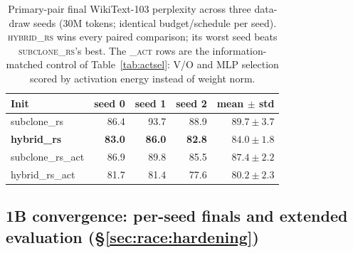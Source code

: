 \begin{table}[h]
\centering
\footnotesize
\caption{Primary-pair final WikiText-103 perplexity across three data-draw seeds
(30M tokens; identical budget/schedule per seed). \textsc{hybrid\_rs} wins every
paired comparison; its worst seed beats \textsc{subclone\_rs}'s best. The
\textsc{\_act} rows are the information-matched control of
Table~\ref{tab:actsel}: V/O and MLP selection scored by activation energy
instead of weight norm.}
\label{tab:seeded}
\begin{tabular}{lrrrr}
\toprule
Init & seed 0 & seed 1 & seed 2 & mean $\pm$ std \\
\midrule
subclone\_rs        & 86.4 & 93.7 & 88.9 & $89.7 \pm 3.7$ \\
\textbf{hybrid\_rs} & \textbf{83.0} & \textbf{86.0} & \textbf{82.8} & $\mathbf{84.0 \pm 1.8}$ \\
\midrule
subclone\_rs\_act   & 86.9 & 89.8 & 85.5 & $87.4 \pm 2.2$ \\
hybrid\_rs\_act     & 81.7 & 81.4 & 77.6 & $80.2 \pm 2.3$ \\
\bottomrule
\end{tabular}
\end{table}

\subsection{1B convergence: per-seed finals and extended evaluation (\S\ref{sec:race:hardening})}
\label{app:conv1b}

